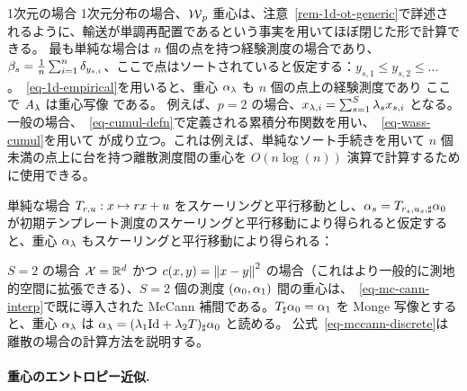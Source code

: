 \begin{rem1}{1次元の場合}\label{rem-bary-1d}
	1次元分布の場合、$\operatorname{\mathcal{W}}_p$ 重心は、注意~\ref{rem-1d-ot-generic}で詳述されるように、輸送が単調再配置であるという事実を用いてほぼ閉じた形で計算できる。
	最も単純な場合は $n$ 個の点を持つ経験測度の場合であり、\ie $\beta_s = \frac{1}{n}\sum_{i=1}^n \delta_{y_{s,i}}$、ここで点はソートされていると仮定する：$y_{s,1} \leq y_{s,2} \leq \ldots$。~\eqref{eq-1d-empirical}を用いると、重心 $\alpha_\lambda$ も $n$ 個の点上の経験測度であり
	ここで $A_\lambda$ は重心写像
	である。
	例えば、$p=2$ の場合、$x_{\lambda,i} = \sum_{s=1}^S \lambda_s x_{s,i}$ となる。
	一般の場合、~\eqref{eq-cumul-defn}で定義される累積分布関数を用い、~\eqref{eq-wass-cumul}を用いて
	が成り立つ。これは例えば、単純なソート手続きを用いて $n$ 個未満の点上に台を持つ離散測度間の重心を $O(n\log(n))$ 演算で計算するために使用できる。
\end{rem1}



\begin{rem1}{単純な場合}
	$T_{r,u} : x \mapsto rx+u$ をスケーリングと平行移動とし、$\alpha_{s} = T_{r_s,u_s,\sharp} \alpha_0$ が初期テンプレート測度のスケーリングと平行移動により得られると仮定すると、重心 $\alpha_\lambda$ もスケーリングと平行移動により得られる：
\end{rem1}


\begin{rem1}{$S=2$ の場合}
	$\mathcal{X}=\mathbb{R}^d$ かつ $c(x,y)=\left\| x-y \right\|^2$ の場合（これはより一般的に測地的空間に拡張できる）、$S=2$ 個の測度 $(\alpha_0,\alpha_1)$ 間の重心は、~\eqref{eq-mc-cann-interp}で既に導入された McCann 補間である。$T_\sharp \alpha_0=\alpha_1$ を Monge 写像とすると、重心 $\alpha_\lambda$ は $\alpha_\lambda = (\lambda_1 \mathrm{Id} + \lambda_2 T)_{\sharp} \alpha_0$ と読める。
	公式~\eqref{eq-mccann-discrete}は離散の場合の計算方法を説明する。
\end{rem1}



\paragraph{重心のエントロピー近似.}

